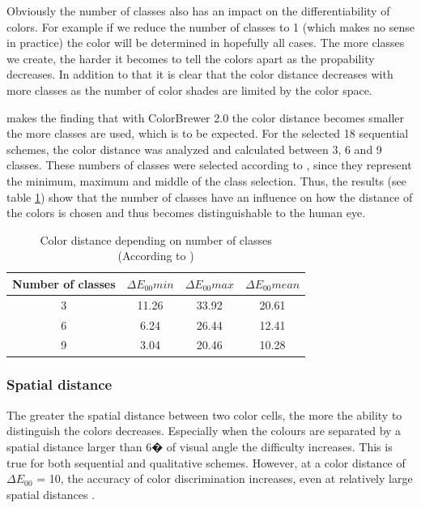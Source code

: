 Obviously the number of classes also has an impact on the differentiability of colors. For example if we reduce the number of classes to 1 (which makes no sense in practice) the color will be determined in hopefully all cases. The more classes we create, the harder it becomes to tell the colors apart as the propability decreases. In addition to that it is clear that the color distance decreases with more classes as the number of color shades are limited by the color space. 

\textcite{brychtovaC2017} makes the finding that with ColorBrewer 2.0 the color distance becomes smaller the more classes are used, which is to be expected. For the selected 18 sequential schemes, the color distance was analyzed and calculated between 3, 6 and 9 classes. These numbers of classes were selected according to \textcite{brychtovaC2017}, since they represent the minimum, maximum and middle of the class selection. Thus, the results (see table \ref{tab:classes}) show that the number of classes have an influence on how the distance of the colors is chosen and thus becomes distinguishable to the human eye. 

\begin{table}[h!]
\centering
\caption[Color distance depending on number of classes]{Color distance depending on number of classes \\ (According to \textcite{brychtovaC2017})}
	\begin{tabular}{c c c c }
		\hline
		\hline
		Number of classes & $\Delta E_{00}min$ & $\Delta E_{00}max$ & $\Delta E_{00}mean$ \\ 
		\hline
		\hline
		3 & 11.26 & 33.92 & 20.61 \\  
		6 & 6.24 & 26.44 & 12.41 \\
		9 & 3.04 & 20.46 & 10.28   
	\end{tabular}
\label{tab:classes}
\end{table}

\subsubsection{Spatial distance}
The greater the spatial distance between two color cells, the more the ability to distinguish the colors decreases. Especially when the colours are separated by a spatial distance larger than 6�  of visual  angle the difficulty increases. This is true for both sequential and qualitative schemes. However, at a color distance of $\Delta E_{00}$ = 10, the accuracy of color discrimination increases, even at relatively large spatial distances \parencite{article}. 


